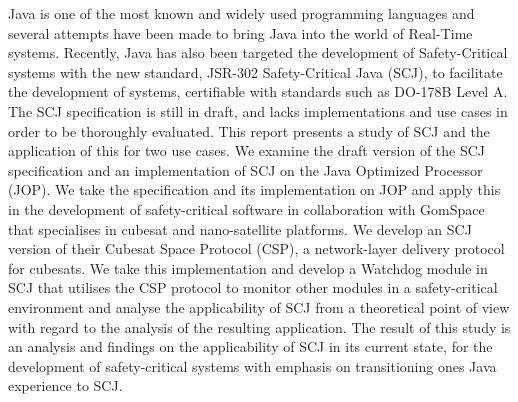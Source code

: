 Java is one of the most known and widely used programming languages and several attempts have been made to bring Java into the world of Real-Time systems. Recently, Java has also been targeted the development of Safety-Critical systems with the new standard, JSR-302 Safety-Critical Java (SCJ), to facilitate the development of systems, certifiable with standards such as DO-178B Level A. The SCJ specification is still in draft, and lacks implementations and use cases in order to be thoroughly evaluated. This report presents a study of SCJ and the application of this for two use cases.
We examine the draft version of the SCJ specification and an implementation of SCJ on the Java Optimized Processor (JOP). We take the specification and its implementation on JOP and apply this in the development of safety-critical software in collaboration with GomSpace that specialises in cubesat and nano-satellite platforms. We develop an SCJ version of their Cubesat Space Protocol (CSP), a network-layer delivery protocol for cubesats. We take this implementation and develop a Watchdog module in SCJ that utilises the CSP protocol to monitor other modules in a safety-critical environment and analyse the applicability of SCJ from a theoretical point of view with regard to the analysis of the resulting application.
The result of this study is an analysis and findings on the applicability of SCJ in its current state, for the development of safety-critical systems with emphasis on transitioning ones Java experience to SCJ.